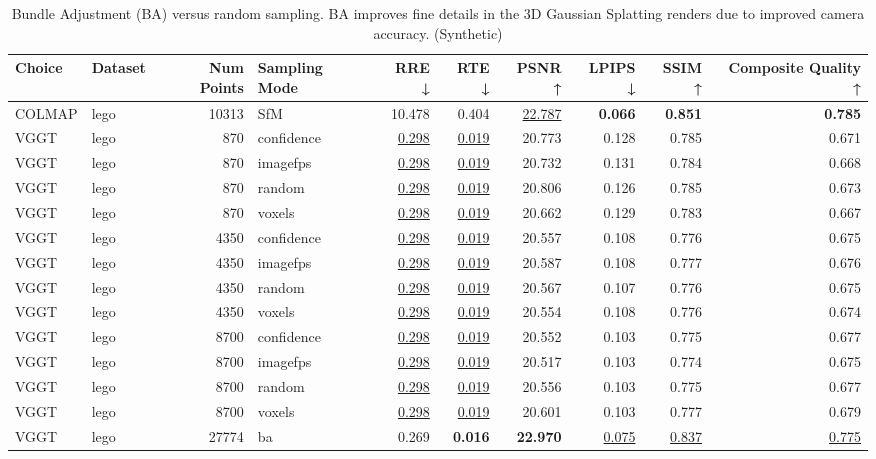 \begin{table}[H]
\caption{\ifdefined\customcaption \customcaption \else Bundle Adjustment (BA) versus random sampling. BA improves fine details in the 3D Gaussian Splatting renders due to improved camera accuracy. (Synthetic) \fi}
\label{tab:03_sampling_mode_ba_synthetic}
\centering
\tiny
\begin{tabular}{llrlrrrrrr}
\toprule
Choice & Dataset & Num Points & Sampling Mode & RRE ↓ & RTE ↓ & PSNR ↑ & LPIPS ↓ & SSIM ↑ & Composite Quality ↑ \\
\midrule
COLMAP & lego & 10313 & SfM & 10.478 & 0.404 & \underline{22.787} & \textbf{0.066} & \textbf{0.851} & \textbf{0.785} \\
VGGT & lego & 870 & confidence & \underline{0.298} & \underline{0.019} & 20.773 & 0.128 & 0.785 & 0.671 \\
VGGT & lego & 870 & imagefps & \underline{0.298} & \underline{0.019} & 20.732 & 0.131 & 0.784 & 0.668 \\
VGGT & lego & 870 & random & \underline{0.298} & \underline{0.019} & 20.806 & 0.126 & 0.785 & 0.673 \\
VGGT & lego & 870 & voxels & \underline{0.298} & \underline{0.019} & 20.662 & 0.129 & 0.783 & 0.667 \\
VGGT & lego & 4350 & confidence & \underline{0.298} & \underline{0.019} & 20.557 & 0.108 & 0.776 & 0.675 \\
VGGT & lego & 4350 & imagefps & \underline{0.298} & \underline{0.019} & 20.587 & 0.108 & 0.777 & 0.676 \\
VGGT & lego & 4350 & random & \underline{0.298} & \underline{0.019} & 20.567 & 0.107 & 0.776 & 0.675 \\
VGGT & lego & 4350 & voxels & \underline{0.298} & \underline{0.019} & 20.554 & 0.108 & 0.776 & 0.674 \\
VGGT & lego & 8700 & confidence & \underline{0.298} & \underline{0.019} & 20.552 & 0.103 & 0.775 & 0.677 \\
VGGT & lego & 8700 & imagefps & \underline{0.298} & \underline{0.019} & 20.517 & 0.103 & 0.774 & 0.675 \\
VGGT & lego & 8700 & random & \underline{0.298} & \underline{0.019} & 20.556 & 0.103 & 0.775 & 0.677 \\
VGGT & lego & 8700 & voxels & \underline{0.298} & \underline{0.019} & 20.601 & 0.103 & 0.777 & 0.679 \\
VGGT & lego & 27774 & ba & 0.269 & \textbf{0.016} & \textbf{22.970} & \underline{0.075} & \underline{0.837} & \underline{0.775} \\

\end{tabular}
\end{table}
